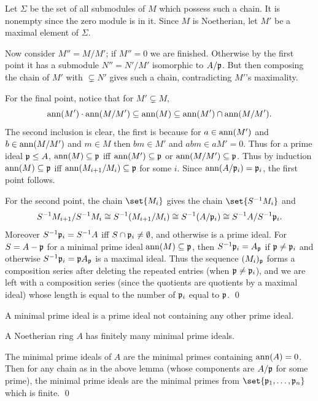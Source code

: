     Let $\Sigma$ be the set of all submodules of $M$ which possess such a chain.
    It is nonempty since the zero module is in it.
    Since $M$ is Noetherian, let $M'$ be a maximal element of $\Sigma$.

    Now consider $M''=M/M'$; if $M''=0$ we are finished.
    Otherwise by the first point it has a submodule $N''=N'/M'$ isomorphic to $A/{{\frak p}}$.
    But then composing the chain of $M'$ with $\subsetneq N'$ gives such a chain, contradicting $M'$'s maximality.

    For the final point, notice that for $M'\subsetneq M$,
    $$ {\rm ann}(M')\cdot{\rm ann}(M/M') \subseteq {\rm ann}(M) \subseteq {\rm ann}(M')\cap{\rm ann}(M/M') . $$
    The second inclusion is clear, the first is because for $a\in{\rm ann}(M')$ and $b\in{\rm ann}(M/M')$ and $m\in M$ then $bm\in M'$ and $abm\in aM'=0$.
    Thus for a prime ideal ${{\frak p}}\leq A$, ${\rm ann}(M)\subseteq{{\frak p}}$ iff ${\rm ann}(M')\subseteq{{\frak p}}$ or ${\rm ann}(M/M')\subseteq{{\frak p}}$.
    Thus by induction ${\rm ann}(M)\subseteq{{\frak p}}$ iff ${\rm ann}(M_{i+1}/M_i)\subseteq{{\frak p}}$ for some $i$.
    Since ${\rm ann}(A/{{\frak p}}_i)={{\frak p}}_i$, the first point follows.

    For the second point, the chain $\set{M_i}$ gives the chain $\set{S^{-1}M_i}$ and
    $$ S^{-1}M_{i+1}/S^{-1}M_i \cong S^{-1}(M_{i+1}/M_i) \cong S^{-1}(A/{{\frak p}}_i) \cong S^{-1}A/S^{-1}{{\frak p}}_i . $$
    Moreover $S^{-1}{{\frak p}}_i=S^{-1}A$ iff $S\cap{{\frak p}}_i\neq\emptyset$, and otherwise is a prime ideal.
    For $S=A-{{\frak p}}$ for a minimal prime ideal ${\rm ann}(M)\subseteq{{\frak p}}$, then $S^{-1}{{\frak p}}_i=A_{{\frak p}}$ if ${{\frak p}}\neq{{\frak p}}_i$ and otherwise $S^{-1}{{\frak p}}_i={{\frak p}} A_{{\frak p}}$ is a maximal ideal.
    Thus the sequence $(M_i)_{{\frak p}}$ forms a composition series after deleting the repeated entries (when ${{\frak p}}\neq{{\frak p}}_i$), and we are left with a composition series (since the quotients are
    quotients by a maximal ideal) whose length is equal to the number of ${{\frak p}}_i$ equal to ${{\frak p}}$.
    \qed

\eproof

\bdefn

    A minimal prime ideal is a prime ideal not containing any other prime ideal.

\edefn

\blemm

    A Noetherian ring $A$ has finitely many minimal prime ideals.

\elemm

\bproof

    The minimal prime ideals of $A$ are the minimal primes containing ${\rm ann}(A)=0$.
    Then for any chain as in the above lemma (whose components are $A/{{\frak p}}$ for some prime), the minimal prime ideals are the minimal primes from $\set{\p_1,\dots,\p_n}$ which is finite.
    \qed

